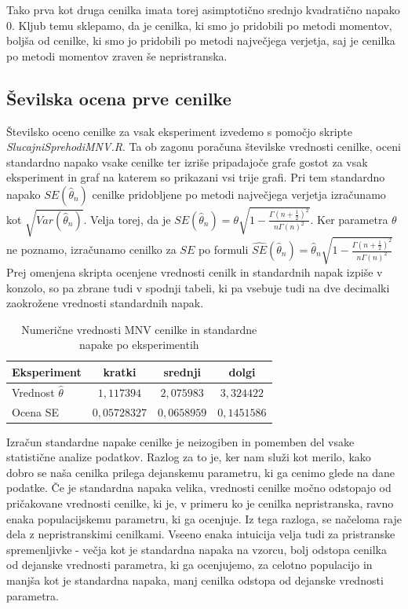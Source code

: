 \documentclass[a4paper, 10pt]{article}
\begin{document}
	Tako prva kot druga cenilka imata torej asimptotično srednjo kvadratično napako $0$. Kljub temu sklepamo, da je cenilka, ki smo jo pridobili po metodi momentov, boljša od cenilke, ki smo jo pridobili po metodi največjega verjetja, saj je cenilka po metodi momentov zraven še nepristranska.
	
	\subsection{Ševilska ocena prve cenilke} \label{subsect: 2D}
	
	Številsko oceno cenilke za vsak eksperiment izvedemo s pomočjo skripte \textit{SlucajniSprehodiMNV.R}. Ta ob zagonu poračuna številske vrednosti cenilke, oceni standardno napako vsake cenilke ter izriše pripadajoče grafe gostot za vsak eksperiment in graf na katerem so prikazani vsi trije grafi. Pri tem standardno napako $SE(\widehat{\theta}_n)$ cenilke pridobljene po metodi največjega verjetja izračunamo kot $\sqrt{Var(\widehat{\theta}_n)}$. Velja torej, da je $SE(\widehat{\theta}_n) = \theta\sqrt{1 - \frac{\Gamma(n + \frac{1}{2})^2}{n\Gamma(n)^2}}$. Ker parametra $\theta$ ne poznamo, izračunamo cenilko za $SE$ po formuli $\widehat{SE}(\widehat{\theta}_n) = \widehat{\theta}_n \sqrt{1 - \frac{\Gamma(n + \frac{1}{2})^2}{n\Gamma(n)^2}}$
	Prej omenjena skripta ocenjene vrednosti cenilk in standardnih napak izpiše v konzolo, so pa zbrane tudi v spodnji tabeli, ki pa vsebuje tudi na dve decimalki zaokrožene vrednosti standardnih napak.
	
	\begin{table}[h!]
		\label{tab: mnvse}
		\centering
		\begin{tabular}{|l|c|c|c|}
			\hline
			Eksperiment & kratki & srednji & dolgi \\ \hline
			Vrednost $\widehat{\theta}$ & $1{,}117394$ & $2{,}075983$ & $3{,}324422$ \\ \hline
			Ocena SE & $0{,}05728327$ & $0{,}0658959$ & $0{,}1451586$ \\ \hline
		\end{tabular}
		\caption{Numerične vrednosti MNV cenilke in standardne napake po eksperimentih}
	\end{table}
	
	Izračun standardne napake cenilke je neizogiben in pomemben del vsake statistične analize podatkov. Razlog za to je, ker nam služi kot merilo, kako dobro se naša cenilka prilega dejanskemu parametru, ki ga cenimo glede na dane podatke. Če je standardna napaka velika, vrednosti cenilke močno odstopajo od pričakovane vrednosti cenilke, ki je, v primeru ko je cenilka nepristranska, ravno enaka populacijskemu parametru, ki ga ocenjuje. Iz tega razloga, se načeloma raje dela z nepristranskimi cenilkami. Vseeno enaka intuicija velja tudi za pristranske spremenljivke - večja kot je standardna napaka na vzorcu, bolj odstopa cenilka od dejanske vrednosti parametra, ki ga ocenjujemo, za celotno populacijo in manjša kot je standardna napaka, manj cenilka odstopa od dejanske vrednosti parametra.
	
\end{document}
